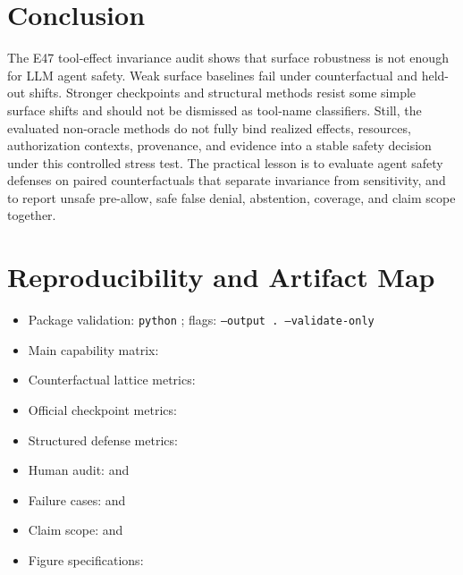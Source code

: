 \documentclass[11pt]{article}
\begin{document}
\section{Conclusion}
The E47 tool-effect invariance audit shows that surface robustness is not enough for LLM agent safety. Weak surface baselines fail under counterfactual and held-out shifts. Stronger checkpoints and structural methods resist some simple surface shifts and should not be dismissed as tool-name classifiers. Still, the evaluated non-oracle methods do not fully bind realized effects, resources, authorization contexts, provenance, and evidence into a stable safety decision under this controlled stress test. The practical lesson is to evaluate agent safety defenses on paired counterfactuals that separate invariance from sensitivity, and to report unsafe pre-allow, safe false denial, abstention, coverage, and claim scope together.

\appendix
\section{Reproducibility and Artifact Map}
\label{app:artifact-map}
{\scriptsize
\begin{itemize}[leftmargin=*]
  \item Package validation: \texttt{python} ; flags: \texttt{--output . --validate-only}
  \item Main capability matrix: 
  \item Counterfactual lattice metrics: 
  \item Official checkpoint metrics: 
  \item Structured defense metrics: 
  \item Human audit:  and 
  \item Failure cases:  and 
  \item Claim scope:  and 
  \item Figure specifications: 
\end{itemize}
}
\end{document}
